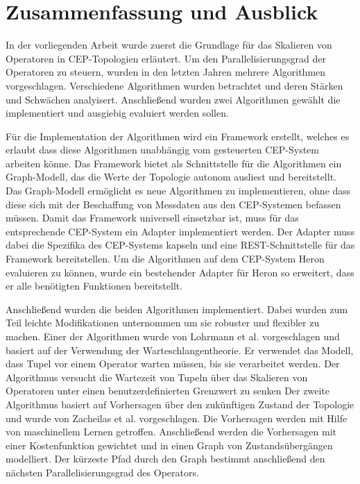 
\chapter{Zusammenfassung und Ausblick}\label{chap:zusfas}
In der vorliegenden Arbeit wurde zuerst die Grundlage für das Skalieren von Operatoren in CEP-Topologien erläutert.
Um den Parallelisierungsgrad der Operatoren zu steuern, wurden in den letzten Jahren mehrere Algorithmen vorgeschlagen.
Verschiedene Algorithmen wurden betrachtet und deren Stärken und Schwächen analyisert.
Anschließend wurden zwei Algorithmen gewählt die implementiert und ausgiebig evaluiert werden sollen.

Für die Implementation der Algorithmen wird ein Framework erstellt, welches es erlaubt dass diese Algorithmen unabhängig vom gesteuerten CEP-System arbeiten könne.
Das Framework bietet als Schnittstelle für die Algorithmen ein Graph-Modell, das die Werte der Topologie autonom ausliest und bereitstellt.
Das Graph-Modell ermöglicht es neue Algorithmen zu implementieren, ohne dass diese sich mit der Beschaffung von Messdaten aus den CEP-Systemen befassen müssen.
Damit das Framework universell einsetzbar ist, muss für das entsprechende CEP-System ein Adapter implementiert werden.
Der Adapter muss dabei die Spezifika des CEP-Systems kapseln und eine REST-Schnittstelle für das Framework bereitstellen.
Um die Algorithmen auf dem CEP-System Heron evaluieren zu können, wurde ein bestehender Adapter für Heron so erweitert, dass er alle benötigten Funktionen bereitstellt.

Anschließend wurden die beiden Algorithmen implementiert.
Dabei wurden zum Teil leichte Modifikationen unternommen um sie robuster und flexibler zu machen.
Einer der Algorithmen wurde von Lohrmann et al. vorgeschlagen und basiert auf der Verwendung der Warteschlangentheorie.
Er verwendet das Modell, dass Tupel vor einem Operator warten müssen, bis sie verarbeitet werden.
Der Algorithmus versucht die Wartezeit von Tupeln über das Skalieren von Operatoren unter einen benutzerdefinierten Grenzwert zu senken
Der zweite Algorithmus basiert auf Vorhersagen über den zukünftigen Zustand der Topologie und wurde von Zacheilas et al. vorgeschlagen.
Die Vorhersagen werden mit Hilfe von maschinellem Lernen getroffen.
Anschließend werden die Vorhersagen mit einer Kostenfunktion gewichtet und in einen Graph von Zustandsübergängen modelliert.
Der kürzeste Pfad durch den Graph bestimmt anschließend den nächsten Parallelisierungsgrad des Operators.

